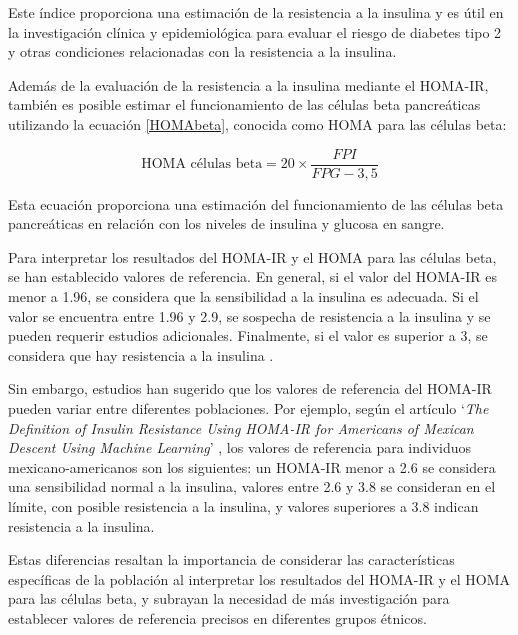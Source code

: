 Este índice proporciona una estimación de la resistencia a la insulina y es útil en la investigación clínica y epidemiológica para evaluar el riesgo de diabetes tipo 2 y otras condiciones relacionadas con la resistencia a la insulina.

Además de la evaluación de la resistencia a la insulina mediante el HOMA-IR, también es posible estimar el funcionamiento de las células beta pancreáticas utilizando la ecuación \eqref{HOMAbeta}, conocida como HOMA para las células beta:

\begin{equation}\label{HOMAbeta}
    \text{HOMA células beta} =  20 \times \frac{FPI}{FPG -3,5}
\end{equation}

Esta ecuación proporciona una estimación del funcionamiento de las células beta pancreáticas en relación con los niveles de insulina y glucosa en sangre.

Para interpretar los resultados del HOMA-IR y el HOMA para las células beta, se han establecido valores de referencia. En general, si el valor del HOMA-IR es menor a 1.96, se considera que la sensibilidad a la insulina es adecuada. Si el valor se encuentra entre 1.96 y 2.9, se sospecha de resistencia a la insulina y se pueden requerir estudios adicionales. Finalmente, si el valor es superior a 3, se considera que hay resistencia a la insulina \cite{limiteHOMA}.

Sin embargo, estudios han sugerido que los valores de referencia del HOMA-IR pueden variar entre diferentes poblaciones. Por ejemplo, según el artículo `\textit{The Definition of Insulin Resistance Using HOMA-IR for Americans of Mexican Descent Using Machine Learning}' \cite{HOMAMex}, los valores de referencia para individuos mexicano-americanos son los siguientes: un HOMA-IR menor a 2.6 se considera una sensibilidad normal a la insulina, valores entre 2.6 y 3.8 se consideran en el límite, con posible resistencia a la insulina, y valores superiores a 3.8 indican resistencia a la insulina.

Estas diferencias resaltan la importancia de considerar las características específicas de la población al interpretar los resultados del HOMA-IR y el HOMA para las células beta, y subrayan la necesidad de más investigación para establecer valores de referencia precisos en diferentes grupos étnicos.


